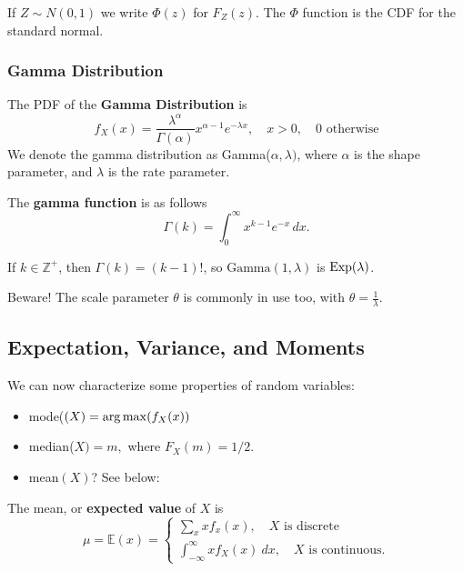 \begin{remark}
If $Z\sim N(0,1)$ we write $\Phi(z)$ for $F_Z(z).$ The $\Phi$ function is the CDF for the standard normal.
\end{remark}

\subsubsection{Gamma Distribution}

\begin{definition}
The PDF of the \textbf{Gamma Distribution} is
$$
f_X(x)=\frac{\lambda^\alpha}{\Gamma(\alpha)}x^{\alpha-1}e^{-\lambda x}, \quad x>0, \quad  0  \text{ otherwise}
$$
We denote the gamma distribution as Gamma($\alpha,\lambda)$, where $\alpha$ is the shape parameter, and $\lambda$ is the rate parameter. 
\end{definition}

\begin{definition}
		The \textbf{gamma function} is as follows
		\[
				\Gamma(k)=\int^\infty_0x^{k-1}e^{-x} \, dx
		.\] 
\end{definition}

If $k\in \mathbb Z^+$, then $\Gamma(k)=(k-1)!$, so $\text{Gamma}(1,\lambda)$ is $\operatorname*{Exp}(\lambda)$.

\begin{remark}
Beware! The scale parameter $\theta$ is commonly in use too, with $\theta=\frac{1}{\lambda}.$
\end{remark}


\subsection{Expectation, Variance, and Moments}
We can now characterize some properties of random variables:
\begin{itemize}
    \item mode($(X) = \operatorname*{arg\,max}(f_X(x))$
    
    \item median($X)=m,$ where $F_X(m)=1/2.$
	\item mean$(X)$? See below:
\end{itemize}

\begin{definition}
		The mean, or \textbf{expected value} of $X$ is
$$
\mu=\mathbb E(x)=
\begin{cases}
\sum_x xf_x(x), \quad X\text{ is discrete} \\
\int^{\infty}_{-\infty}xf_X(x) \ dx, \quad X \text{ is continuous.}
\end{cases}
$$
\end{definition}

